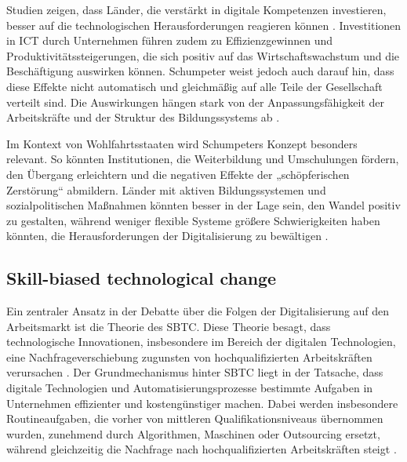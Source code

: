 Studien zeigen, dass Länder, die verstärkt in digitale Kompetenzen investieren, besser auf 
die technologischen Herausforderungen reagieren können 
\parencite[S. 15–17]{oecd2019measuring}. Investitionen in \ac{ICT} durch Unternehmen führen 
zudem zu Effizienzgewinnen und Produktivitätssteigerungen, die sich positiv auf das 
Wirtschaftswachstum und die Beschäftigung auswirken können. Schumpeter weist jedoch auch 
darauf hin, dass diese Effekte nicht automatisch und gleichmäßig auf alle Teile der 
Gesellschaft verteilt sind. Die Auswirkungen hängen stark von der Anpassungsfähigkeit der 
Arbeitskräfte und der Struktur des Bildungssystems ab \parencite[S. 48]{oecd2019measuring}.

Im Kontext von Wohlfahrtsstaaten wird Schumpeters Konzept besonders relevant. So könnten 
Institutionen, die Weiterbildung und Umschulungen fördern, den Übergang erleichtern und die 
negativen Effekte der „schöpferischen Zerstörung“ abmildern. Länder mit aktiven 
Bildungssystemen und sozialpolitischen Maßnahmen könnten besser in der Lage sein, den 
Wandel positiv zu gestalten, während weniger flexible Systeme größere Schwierigkeiten haben 
könnten, die Herausforderungen der Digitalisierung zu bewältigen 
\parencite[vgl.][S. 29–31]{espingandersen1990thethree}.


\subsection{Skill-biased technological change}

Ein zentraler Ansatz in der Debatte über die Folgen der Digitalisierung auf den 
Arbeitsmarkt ist die Theorie des \ac{SBTC}. Diese Theorie besagt, dass technologische 
Innovationen, insbesondere im Bereich der digitalen Technologien, eine 
Nachfrageverschiebung zugunsten von hochqualifizierten Arbeitskräften verursachen 
\parencite[vgl.][S. 25–26]{acemoglu2002technical}. Der Grundmechanismus hinter \ac{SBTC} 
liegt in der Tatsache, dass digitale Technologien und Automatisierungsprozesse bestimmte 
Aufgaben in Unternehmen effizienter und kostengünstiger machen. Dabei werden insbesondere 
Routineaufgaben, die vorher von mittleren Qualifikationsniveaus übernommen wurden, 
zunehmend durch Algorithmen, Maschinen oder Outsourcing ersetzt, während gleichzeitig die 
Nachfrage nach hochqualifizierten Arbeitskräften steigt 
\parencite[vgl.][S. 1282]{autor2003theskill}.

